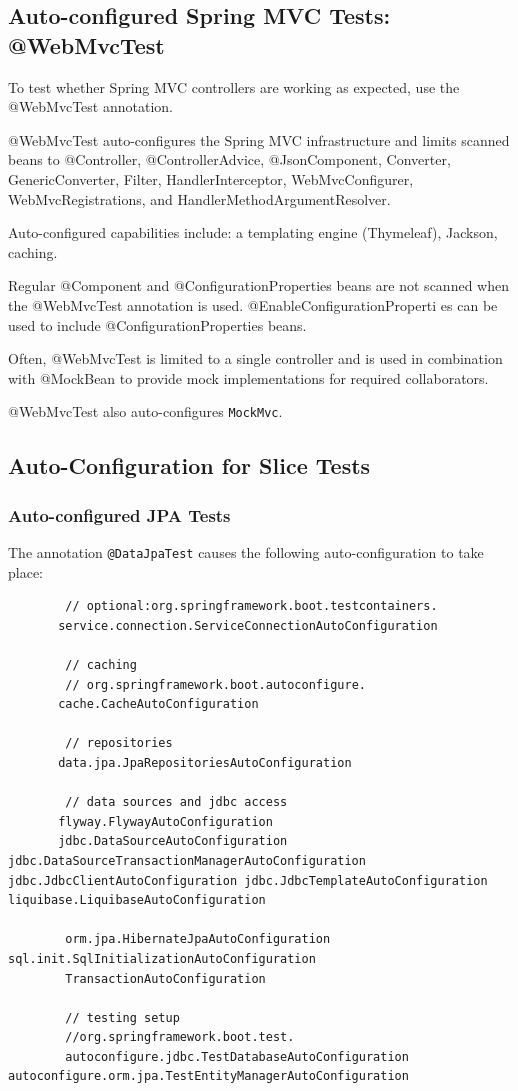 \documentclass{scrartcl}
\begin{document}
\subsection{Auto-configured Spring MVC Tests: @WebMvcTest}

To test whether Spring MVC controllers are working as expected, use the @WebMvcTest annotation.

@WebMvcTest auto-configures the Spring MVC infrastructure and limits scanned beans to @Controller, @ControllerAdvice, @JsonComponent, Converter, GenericConverter, Filter, HandlerInterceptor, WebMvcConfigurer, WebMvcRegistrations, and HandlerMethodArgumentResolver.

Auto-configured capabilities include: a templating engine (Thymeleaf), Jackson, caching.

Regular @Component and @ConfigurationProperties beans are not scanned when the @WebMvcTest annotation is used. @EnableConfigurationProperti es can be used to include @ConfigurationProperties beans.

Often, @WebMvcTest is limited to a single controller and is used in combination with @MockBean to provide mock implementations for required collaborators.

@WebMvcTest also auto-configures \lstinline|MockMvc|.


\subsection{Auto-Configuration for Slice Tests}
\subsubsection{Auto-configured JPA Tests}

The annotation \lstinline|@DataJpaTest| causes the following auto-configuration to take place:

\begin{lstlisting}
        // optional:org.springframework.boot.testcontainers.
       service.connection.ServiceConnectionAutoConfiguration

        // caching
        // org.springframework.boot.autoconfigure.
       cache.CacheAutoConfiguration

        // repositories
       data.jpa.JpaRepositoriesAutoConfiguration

        // data sources and jdbc access
       flyway.FlywayAutoConfiguration
       jdbc.DataSourceAutoConfiguration jdbc.DataSourceTransactionManagerAutoConfiguration jdbc.JdbcClientAutoConfiguration jdbc.JdbcTemplateAutoConfiguration liquibase.LiquibaseAutoConfiguration

        orm.jpa.HibernateJpaAutoConfiguration sql.init.SqlInitializationAutoConfiguration
        TransactionAutoConfiguration

        // testing setup
        //org.springframework.boot.test.
        autoconfigure.jdbc.TestDatabaseAutoConfiguration autoconfigure.orm.jpa.TestEntityManagerAutoConfiguration

\end{lstlisting}
\end{document}
